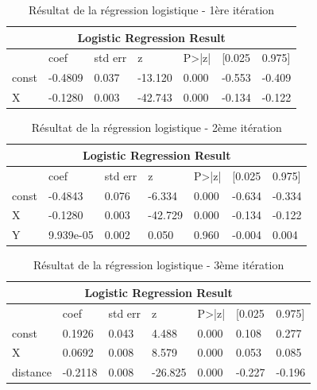 \documentclass[12pt]{article}
\begin{document}
\begin{table}[htp]
    \centering
    \begin{tabular}{lllllll}
        \multicolumn{7}{c}{\textbf{Logistic Regression Result}}                        \\ \hline
              & coef    & std err & z       & P\textgreater{}|z| & {[}0.025 & 0.975{]} \\ \hline
        const & -0.4809 & 0.037   & -13.120 & 0.000              & -0.553   & -0.409   \\
        X     & -0.1280 & 0.003   & -42.743 & 0.000              & -0.134   & -0.122   \\ \hline
        \end{tabular}
    \caption{Résultat de la régression logistique - 1ère itération}
    \label{tab:logistic_regression_result_1}
\end{table}
\begin{table}[htp]
    \centering
    \begin{tabular}{lllllll}
    \multicolumn{7}{c}{\textbf{Logistic Regression Result}}                          \\ \hline
          & coef      & std err & z       & P\textgreater{}|z| & {[}0.025 & 0.975{]} \\ \hline
    const & -0.4843   & 0.076   & -6.334  & 0.000              & -0.634   & -0.334   \\
    X     & -0.1280   & 0.003   & -42.729 & 0.000              & -0.134   & -0.122   \\
    Y     & 9.939e-05 & 0.002   & 0.050   & 0.960              & -0.004   & 0.004   \\ \hline
    \end{tabular}
    \caption{Résultat de la régression logistique - 2ème itération}
    \label{tab:logistic_regression_result_2}
\end{table}
\begin{table}[htp]
    \centering
    \begin{tabular}{lllllll}
    \multicolumn{7}{c}{\textbf{Logistic Regression Result}}                           \\ \hline
             & coef    & std err & z       & P\textgreater{}|z| & {[}0.025 & 0.975{]} \\ \hline
    const    & 0.1926  & 0.043   & 4.488   & 0.000              & 0.108    & 0.277    \\
    X        & 0.0692  & 0.008   & 8.579   & 0.000              & 0.053    & 0.085    \\
    distance & -0.2118 & 0.008   & -26.825 & 0.000              & -0.227   & -0.196   \\ \hline
    \end{tabular}
    \caption{Résultat de la régression logistique - 3ème itération}
    \label{tab:logistic_regression_result_3}
\end{table}
\end{document}
